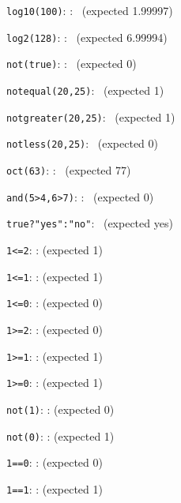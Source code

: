 \documentclass{article}
\begin{document}
%


\verb|log10(100)|:
    :
   \pgfmathresult\ (expected  1.99997)

\verb|log2(128)|:
    :
   \pgfmathresult\ (expected  6.99994)

\verb|not(true)|:
    :
   \pgfmathresult\ (expected  0)

\verb|notequal(20,25)|:
   \pgfmathresult\ (expected  1)

\verb|notgreater(20,25)|:
   \pgfmathresult\ (expected  1)

\verb|notless(20,25)|:
   \pgfmathresult\ (expected  0)

\verb|oct(63)|:
    :
   \pgfmathresult\ (expected  77)

\verb|and(5>4,6>7)|:
    :
   \pgfmathresult\ (expected  0)

\verb|true?"yes":"no"|:
   \pgfmathresult\ (expected  yes)


\verb|1<=2|:
	:
	\pgfmathresult (expected 1)

\verb|1<=1|:
	:
	\pgfmathresult (expected 1)

\verb|1<=0|:
	:
	\pgfmathresult (expected 0)

\verb|1>=2|:
	:
	\pgfmathresult (expected 0)

\verb|1>=1|:
	:
	\pgfmathresult (expected 1)

\verb|1>=0|:
	:
	\pgfmathresult (expected 1)

\verb|not(1)|:
	:
	\pgfmathresult (expected 0)

\verb|not(0)|:
	:
	\pgfmathresult (expected 1)

\verb|1==0|:
	:
	\pgfmathresult (expected 0)

\verb|1==1|:
	:
	\pgfmathresult (expected 1)
\end{document}
